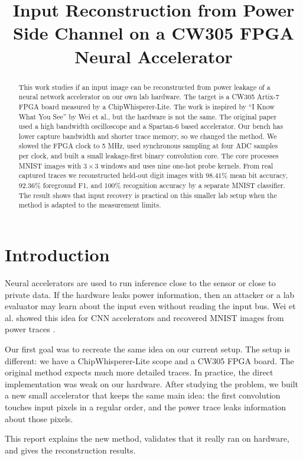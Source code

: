 \documentclass[10pt,conference]{IEEEtran}
\title{Input Reconstruction from Power Side Channel on a CW305 FPGA Neural Accelerator}
\author{
  \IEEEauthorblockN{Lab Reproduction Report}
  \IEEEauthorblockA{Controlled side-channel research lab\\
  Project: MNIST BNN on CW305 and ChipWhisperer-Lite}
}
\begin{document}
\maketitle

\begin{abstract}
This work studies if an input image can be reconstructed from power leakage of
a neural network accelerator on our own lab hardware. The target is a CW305
Artix-7 FPGA board measured by a ChipWhisperer-Lite. The work is inspired by
``I Know What You See'' by Wei et al., but the hardware is not the same. The
original paper used a high bandwidth oscilloscope and a Spartan-6 based
accelerator. Our bench has lower capture bandwidth and shorter trace memory, so
we changed the method. We slowed the FPGA clock to 5 MHz, used synchronous
sampling at four ADC samples per clock, and built a small leakage-first binary
convolution core. The core processes MNIST images with $3\times3$ windows and
uses nine one-hot probe kernels. From real captured traces we reconstructed
held-out digit images with 98.41\% mean bit accuracy, 92.36\% foreground F1,
and 100\% recognition accuracy by a separate MNIST classifier. The result shows
that input recovery is practical on this smaller lab setup when the method is
adapted to the measurement limits.
\end{abstract}

\section{Introduction}

Neural accelerators are used to run inference close to the sensor or close to
private data. If the hardware leaks power information, then an attacker or a
lab evaluator may learn about the input even without reading the input bus. Wei
et al. showed this idea for CNN accelerators and recovered MNIST images from
power traces \cite{wei2018iknow}.

Our first goal was to recreate the same idea on our current setup. The setup is
different: we have a ChipWhisperer-Lite scope and a CW305 FPGA board. The
original method expects much more detailed traces. In practice, the direct
implementation was weak on our hardware. After studying the problem, we built a
new small accelerator that keeps the same main idea: the first convolution
touches input pixels in a regular order, and the power trace leaks information
about those pixels.

This report explains the new method, validates that it really ran on hardware,
and gives the reconstruction results.
\end{document}
